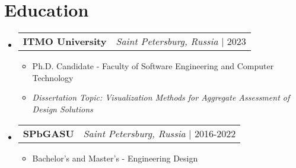 \documentclass[letterpaper,12pt]{article}
\makeatletter
\newcommand{\resumeItem}[1]{
  \item\small{
    {#1 \vspace{-2pt}}
  }
}
\newcommand{\resumeProjectHeading}[2]{
    \item
    \begin{tabular*}{0.97\textwidth}{l@{\extracolsep{\fill}}r}
      \small#1 & #2 \\
    \end{tabular*}\vspace{-7pt}
}
\newcommand{\resumeSubHeadingListStart}{\begin{itemize}[leftmargin=0.15in, label={}]}
\newcommand{\resumeSubHeadingListEnd}{\end{itemize}}
\newcommand{\resumeItemListStart}{\begin{itemize}}
\newcommand{\resumeItemListEnd}{\end{itemize}\vspace{-5pt}}
\makeatother
\begin{document}
\section{Education}
  \resumeSubHeadingListStart
  

\resumeProjectHeading
{\textbf{ITMO University}}
{\footnotesize\emph{Saint Petersburg, Russia} $|$ {2023}}
\resumeItemListStart
\resumeItem{{Ph.D. Candidate - Faculty of Software Engineering and Computer Technology}}
\resumeItem{\textit{Dissertation Topic: Visualization Methods for Aggregate Assessment of Design Solutions}}
\resumeItemListEnd
\resumeProjectHeading
{\textbf{SPbGASU}}
{\footnotesize\emph{Saint Petersburg, Russia} $|$ {2016-2022}}
\resumeItemListStart
\resumeItem{{Bachelor's and Master's - Engineering Design}}
\resumeItemListEnd

  \resumeSubHeadingListEnd
\end{document}
